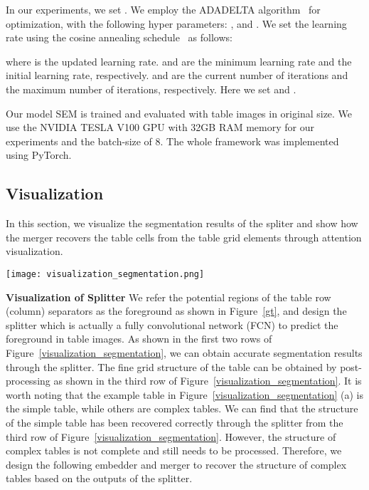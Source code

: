 \documentclass[review]{elsarticle}
\begin{document}
In our experiments, we set . We employ the ADADELTA algorithm~\cite{ADADELTA} for optimization, with the following hyper parameters: ,  and . We set the learning rate using the cosine annealing schedule~\cite{sgdr} as follows:

where  is the updated learning rate.  and  are the minimum learning rate and the initial learning rate, respectively.  and  are the current number of iterations and the maximum number of iterations, respectively. Here we set  and .

Our model SEM is trained and evaluated with table images in original size. We use the NVIDIA TESLA V100 GPU with 32GB RAM memory for our experiments and the batch-size of 8. The whole framework was implemented using PyTorch.

\subsection{Visualization}
In this section, we visualize the segmentation results of the spliter and show how the merger recovers the table cells from the table grid elements through attention visualization.

\begin{figure*}[!htb]
	\centerline{\texttt{[image: visualization\_segmentation.png]}}
	\caption{The visualization results from our system on table images of the SciTSR dataset. \textbf{First Row:} the green masks are the segmentation results of the row segmenter in the splitter. \textbf{Second Row:} the green masks are the segmentation results of the column segmenter in the splitter. \textbf{Third Row:} the blue lines indicate the boundaries of the basic table grids which are extracted through post-processing from both row and column segmentation results. \textbf{Fourth Row:} the blue lines indicate the boundaries of the table cells which are the merged results from the merger.}
	\label{visualization_segmentation}
\end{figure*}

\textbf{Visualization of Splitter} We refer the potential regions of the table row (column) separators as the foreground as shown in Figure~\ref{gt}, and design the splitter which is actually a fully convolutional network (FCN) to predict the foreground in table images. As shown in the first two rows of Figure~\ref{visualization_segmentation}, we can obtain accurate segmentation results through the splitter. The fine grid structure of the table can be obtained by post-processing as shown in the third row of Figure~\ref{visualization_segmentation}. It is worth noting that the example table in Figure~\ref{visualization_segmentation} (a) is the simple table, while others are complex tables. We can find that the structure of the simple table has been recovered correctly through the splitter from the third row of Figure~\ref{visualization_segmentation}. However, the structure of complex tables is not complete and still needs to be processed. Therefore, we design the following embedder and merger to recover the structure of complex tables based on the outputs of the splitter.
\end{document}
